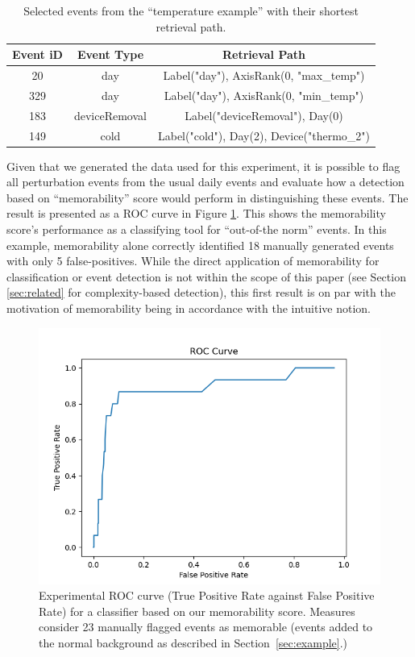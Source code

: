 \documentclass[entropy,article,submit,moreauthors,pdftex]{Definitions/mdpi}
\begin{document}
\begin{table}
    \centering
    \begin{tabular}{c|c|c}
        Event iD & Event Type    & Retrieval Path                             \\
        \hline
        20       & day           & Label("day"), AxisRank(0, "max\_temp")     \\
        329      & day           & Label("day"), AxisRank(0, "min\_temp")     \\
        183      & deviceRemoval & Label("deviceRemoval"), Day(0)             \\
        149      & cold          & Label("cold"), Day(2), Device("thermo\_2") \\
    \end{tabular}
    \caption{Selected events from the ``temperature example'' with their shortest retrieval path.}
    \label{tab:paths}
\end{table}

Given that we generated the data used for this experiment, it is possible to
flag all perturbation events from the usual daily events and evaluate how a
detection based on ``memorability'' score would perform in distinguishing these
events. The result is presented as a ROC curve in Figure \ref{fig:roc}. This shows the memorability score's performance as a classifying tool for ``out-of-the norm'' events. In this example, memorability alone correctly identified 18 manually generated events with only 5 false-positives. While the direct application of memorability for classification or event detection is not within the scope of this paper (see Section \ref{sec:related} for complexity-based detection), this first result is on par with the motivation of memorability being in accordance with the intuitive notion.

\begin{figure}[ht]
    \centering
    \includegraphics[width=0.7\linewidth]{./figures/roc}
    \caption{Experimental ROC curve (True Positive Rate against False Positive
        Rate) for a classifier based on our memorability score. Measures consider 23
        manually flagged events as memorable (events added to the normal background
        as described in Section~\ref{sec:example}.)}
    \label{fig:roc}
\end{figure}
\end{document}
